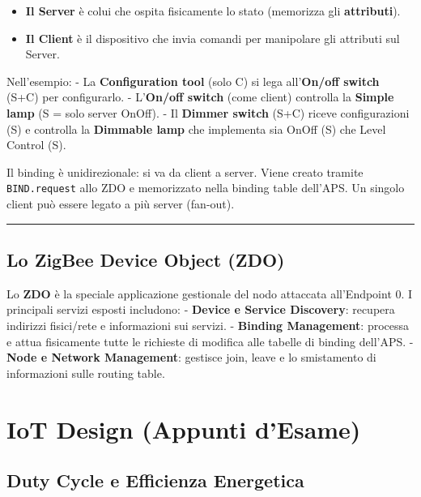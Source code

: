 \documentclass[
  italian,
  openany]{book}
\providecommand{\tightlist}{%
  \setlength{\itemsep}{0pt}\setlength{\parskip}{0pt}}
\begin{document}
\begin{itemize}
\tightlist
\item
  \textbf{Il Server} è colui che ospita fisicamente lo stato (memorizza
  gli \textbf{attributi}).
\item
  \textbf{Il Client} è il dispositivo che invia comandi per manipolare
  gli attributi sul Server.
\end{itemize}

Nell'esempio: - La \textbf{Configuration tool} (solo C) si lega
all'\textbf{On/off switch} (S+C) per configurarlo. - L'\textbf{On/off
switch} (come client) controlla la \textbf{Simple lamp} (S = solo server
OnOff). - Il \textbf{Dimmer switch} (S+C) riceve configurazioni (S) e
controlla la \textbf{Dimmable lamp} che implementa sia OnOff (S) che
Level Control (S).

Il binding è unidirezionale: si va da client a server. Viene creato
tramite \texttt{BIND.request} allo ZDO e memorizzato nella binding table
dell'APS. Un singolo client può essere legato a più server (fan-out).

\begin{center}\rule{0.5\linewidth}{0.5pt}\end{center}

\section{Lo ZigBee Device Object
(ZDO)}\label{lo-zigbee-device-object-zdo}

Lo \textbf{ZDO} è la speciale applicazione gestionale del nodo attaccata
all'Endpoint 0. I principali servizi esposti includono: - \textbf{Device
e Service Discovery}: recupera indirizzi fisici/rete e informazioni sui
servizi. - \textbf{Binding Management}: processa e attua fisicamente
tutte le richieste di modifica alle tabelle di binding dell'APS. -
\textbf{Node e Network Management}: gestisce join, leave e lo
smistamento di informazioni sulle routing table.

\newpage

\chapter{IoT Design (Appunti d'Esame)}\label{iot-design-appunti-desame}

\section{Duty Cycle e Efficienza
Energetica}\label{duty-cycle-e-efficienza-energetica}
\end{document}
